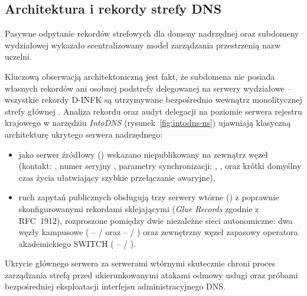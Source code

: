 \subsection{Architektura i rekordy strefy DNS}\label{subsec:rekordy-dns}

Pasywne odpytanie rekordów strefowych dla domeny nadrzędnej  oraz subdomeny wydziałowej  wykazało scentralizowany model zarządzania przestrzenią nazw uczelni.


Kluczową obserwacją architektoniczną jest fakt, że subdomena  nie posiada własnych rekordów  ani osobnej podstrefy delegowanej na serwery wydziałowe -- wszystkie rekordy D-INFK są utrzymywane bezpośrednio wewnątrz monolitycznej strefy głównej . Analiza rekordu  oraz audyt delegacji na poziomie serwera rejestru krajowego  w narzędziu \textit{IntoDNS} (rysunek~\ref{fig:intodns-ns}) ujawniają klasyczną architekturę ukrytego serwera nadrzędnego:
\begin{itemize}
    \item jako serwer źródłowy () wskazano niepublikowany na zewnątrz węzeł  (kontakt: , numer seryjny , parametry synchronizacji: , ,  oraz krótki domyślny czas życia  ułatwiający szybkie przełączanie awaryjne),
    \item ruch zapytań publicznych obsługują trzy serwery wtórne () z poprawnie skonfigurowanymi rekordami sklejającymi (\textit{Glue Records} zgodnie z RFC~1912), rozproszone pomiędzy dwie niezależne sieci autonomiczne: dwa węzły kampusowe ( --  /  oraz  --  / ) oraz zewnętrzny węzeł zapasowy operatora akademickiego SWITCH ( --  / ).
\end{itemize}
Ukrycie głównego serwera  za serwerami wtórnymi skutecznie chroni proces zarządzania strefą przed ukierunkowanymi atakami odmowy usługi oraz próbami bezpośredniej eksploatacji interfejsu administracyjnego DNS.


